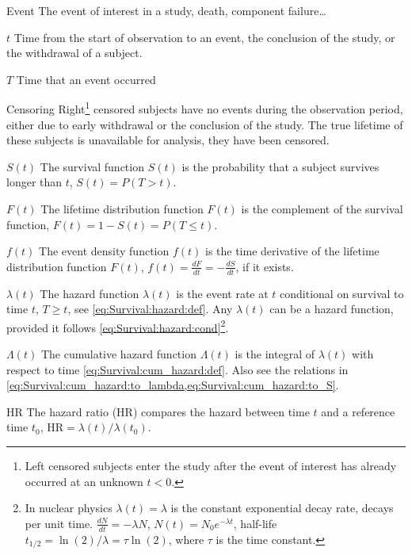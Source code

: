 \begin{symbollist}
	\item[Event] The event of interest in a study, \eg death, component failure\ldots
	\item[$t$] Time from the start of observation to an event, the conclusion of the study, or the withdrawal of a subject.
	\item[$T$] Time that an event occurred
	\item[Censoring] Right\footnote{Left censored subjects enter the study after the event of interest has already occurred at an unknown $t < 0$.} censored subjects have no events during the observation period, either due to early withdrawal or the conclusion of the study. The true lifetime of these subjects is unavailable for analysis, \ie they have been censored.
	\item[$S\left(t\right)$] The survival function $S\left(t\right)$ is the probability that a subject survives longer than $t$, \ie $S\left(t\right) = P\left(T > t\right)$.
	\item[$F\left(t\right)$] The lifetime distribution function $F\left(t\right)$ is the complement of the survival function, \ie $F\left(t\right) = 1 - S\left(t\right) = P\left(T \leq t\right)$.
	\item[$f\left(t\right)$] The event density function $f\left(t\right)$ is the time derivative of the lifetime distribution function $F\left(t\right)$, $f\left(t\right) = \frac{dF}{dt} = -\frac{dS}{dt}$, if it exists.
	\item[$\lambda\left(t\right)$] The hazard function $\lambda\left(t\right)$ is the event rate at $t$ conditional on survival to time $t$, \ie $T \geq t$, see \cref{eq:Survival:hazard:def}. Any $\lambda\left(t\right)$ can be a hazard function, provided it follows \cref{eq:Survival:hazard:cond}\footnote{In nuclear physics $\lambda\left(t\right) = \lambda$ is the constant exponential decay rate, decays per unit time. $\frac{dN}{dt} = -\lambda N$, $N\left(t\right) = N_{0} e^{-\lambda t}$, half-life $t_{1/2} = \ln\left(2\right) / \lambda = \tau \ln\left(2\right)$, where $\tau$ is the time constant.}.
	\item[$\Lambda\left(t\right)$] The cumulative hazard function $\Lambda\left(t\right)$ is the integral of $\lambda\left(t\right)$ with respect to time \cref{eq:Survival:cum_hazard:def}. Also see the relations in \cref{eq:Survival:cum_hazard:to_lambda,eq:Survival:cum_hazard:to_S}.
	\item[HR] The hazard ratio (HR) compares the hazard between time $t$ and a reference time $t_{0}$, $\text{HR} = \lambda\left(t\right) / \lambda\left(t_{0}\right)$. %
\end{symbollist}

